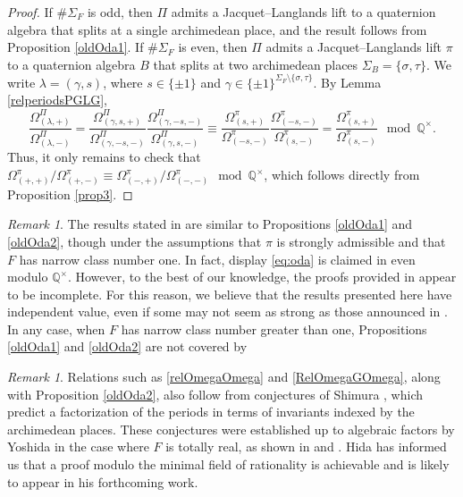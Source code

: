 \documentclass{amsart}
\theoremstyle{definition}
\theoremstyle{remark}
\newtheorem{remark}[theorem]{Remark}
\numberwithin{equation}{section}
\newcommand{\Q}{{\mathbb Q}}
\begin{document}
\begin{proof}
If $\#\Sigma_F$ is odd, then $\Pi$ admits a Jacquet–Langlands lift to a quaternion algebra that splits at a single archimedean place, and the result follows from Proposition \ref{oldOda1}. If $\#\Sigma_F$ is even, then $\Pi$  admits a Jacquet–Langlands lift $\pi$ to a quaternion algebra $B$  that splits at two archimedean places $\Sigma_{B}=\{\sigma,\tau\}$. We write $\lambda=(\gamma,s)$, where $s\in\{\pm 1\}$ and $\gamma\in \{\pm 1\}^{\Sigma_F\setminus\{\sigma,\tau\}}$. By Lemma  \ref{relperiodsPGLG}, 
\[
 \frac{\Omega^\Pi_{(\lambda,+)}}{\Omega^\Pi_{(\lambda,-)}}= \frac{\Omega^\Pi_{(\gamma,s,+)}}{\Omega^\Pi_{(\gamma,-s,-)}} \frac{\Omega^\Pi_{(\gamma,-s,-)}}{\Omega^\Pi_{(\gamma,s,-)}}\equiv  \frac{\Omega^{\pi}_{(s,+)}}{\Omega^\pi_{(-s,-)}} \frac{\Omega^\pi_{(-s,-)}}{\Omega^\pi_{(s,-)}}= \frac{\Omega^{\pi}_{(s,+)}}{\Omega^\pi_{(s,-)}}\mod\Q^\times.
\]
Thus, it only remains to check that $\Omega^{\pi}_{(+,+)}/\Omega^\pi_{(+,-)}\equiv \Omega^{\pi}_{(-,+)}/\Omega^\pi_{(-,-)}\mod\Q^\times$, which follows directly from Proposition \ref{prop3}.
\end{proof}

\begin{remark}

  The results stated in \cite{oda83} are similar to Propositions \ref{oldOda1} and \ref{oldOda2}, though under the assumptions that $\pi$ is strongly admissible and that $F$  has narrow class number one. In fact, display \eqref{eq:oda} is claimed in \cite{oda83} even modulo $\mathbb{Q}^\times $. However, to the best of our knowledge, the proofs provided in \cite{oda83} appear to be incomplete. For this reason, we believe that the results presented here have independent value, even if some may not seem as strong as those announced in \cite{oda83}. In any case, when $F$ has narrow class number greater than one, Propositions \ref{oldOda1} and \ref{oldOda2} are not covered by \cite{oda83}
\end{remark}


\begin{remark}
 Relations such as \eqref{relOmegaOmega} and \eqref{RelOmegaGOmega}, along with Proposition \ref{oldOda2}, also follow from conjectures of Shimura \cite{sh83}, which predict a factorization of the periods in terms of invariants indexed by the archimedean places. These conjectures were established up to algebraic factors by Yoshida in the case where $F$ is totally real, as shown in \cite{yoshida} and \cite{yoshida-duke}. Hida has informed us that a proof modulo the minimal field of rationality is achievable and is likely to appear in his forthcoming work.
\end{remark}
\end{document}
